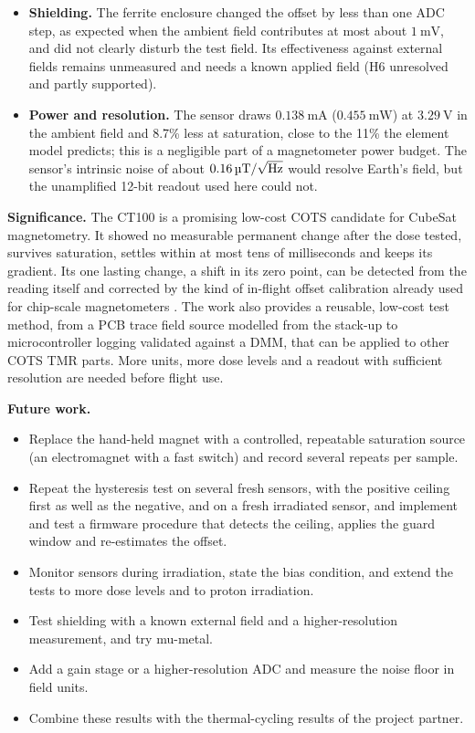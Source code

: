 \documentclass[12pt,a4paper]{article}
\begin{document}
\begin{itemize}
\item \textbf{Shielding.} The ferrite enclosure changed the offset by less than one ADC step, as expected when the ambient field contributes at most about $\SI{1}{\milli\volt}$, and did not clearly disturb the test field. Its effectiveness against external fields remains unmeasured and needs a known applied field (H6 unresolved and partly supported).
\item \textbf{Power and resolution.} The sensor draws $\SI{0.138}{\milli\ampere}$ ($\SI{0.455}{\milli\watt}$) at $\SI{3.29}{\volt}$ in the ambient field and 8.7\% less at saturation, close to the 11\% the element model predicts; this is a negligible part of a magnetometer power budget. The sensor's intrinsic noise of about $\SI{0.16}{\micro\tesla\per\sqrt{\hertz}}$ would resolve Earth's field, but the unamplified 12-bit readout used here could not.
\end{itemize}

\textbf{Significance.} The CT100 is a promising low-cost COTS candidate for CubeSat magnetometry. It showed no measurable permanent change after the dose tested, survives saturation, settles within at most tens of milliseconds and keeps its gradient. Its one lasting change, a shift in its zero point, can be detected from the reading itself and corrected by the kind of in-flight offset calibration already used for chip-scale magnetometers \cite{archer2015}. The work also provides a reusable, low-cost test method, from a PCB trace field source modelled from the stack-up to microcontroller logging validated against a DMM, that can be applied to other COTS TMR parts. More units, more dose levels and a readout with sufficient resolution are needed before flight use.

\textbf{Future work.}
\begin{itemize}
\item Replace the hand-held magnet with a controlled, repeatable saturation source (an electromagnet with a fast switch) and record several repeats per sample.
\item Repeat the hysteresis test on several fresh sensors, with the positive ceiling first as well as the negative, and on a fresh irradiated sensor, and implement and test a firmware procedure that detects the ceiling, applies the guard window and re-estimates the offset.
\item Monitor sensors during irradiation, state the bias condition, and extend the tests to more dose levels and to proton irradiation.
\item Test shielding with a known external field and a higher-resolution measurement, and try mu-metal.
\item Add a gain stage or a higher-resolution ADC and measure the noise floor in field units.
\item Combine these results with the thermal-cycling results of the project partner.
\end{itemize}
\end{document}
